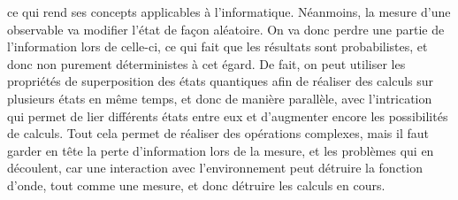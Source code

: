 ce qui rend ses concepts applicables à l'informatique.
Néanmoins, la mesure d’une observable va modifier l’état de façon aléatoire.
On va donc perdre une partie de l'information lors de celle-ci, ce qui fait que les résultats sont
probabilistes, et donc non purement déterministes à cet égard.
De fait, on peut utiliser les propriétés de superposition des états quantiques afin de réaliser des calculs
sur plusieurs états en même temps, et donc de manière parallèle, avec l'intrication qui permet de lier différents
états entre eux et d'augmenter encore les possibilités de calculs.
Tout cela permet de réaliser des opérations complexes, mais il faut garder en tête la perte d'information lors
de la mesure, et les problèmes qui en découlent, car une interaction avec l'environnement peut détruire la
fonction d'onde, tout comme une mesure, et donc détruire les calculs en cours.